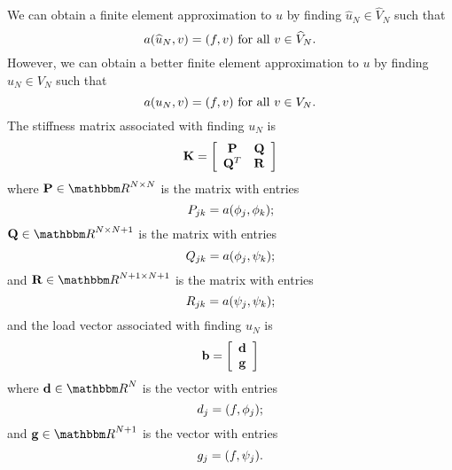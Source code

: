 We can obtain a finite element approximation to $u$ by finding $\widehat{u}_N\in\widehat{V}_N$ such that
\[
a(\widehat{u}_N,v)=(f,v)\mbox{ for all }v\in\widehat{V}_N.
\]
However, we can obtain a better finite element approximation to $u$ by finding $u_N\in V_N$ such that
\[
a(u_N,v)=(f,v)\mbox{ for all }v\in V_N.
\]
The stiffness matrix associated with finding $u_N$ is
\[
{\bf K}=\left[\begin{array}{cc}{\bf P} & {\bf Q} \\ {\bf Q}^T & {\bf R}\end{array}\right]
\]
where $\BP\in\R^{N\times N}$ is the matrix with entries
\[
P_{jk}=a(\phi_j,\phi_k);
\]
$\BQ\in\R^{N\times N+1}$ is the matrix with entries
\[
Q_{jk}=a(\phi_j,\psi_k);
\]
and $\BR\in\R^{N+1\times N+1}$ is the matrix with entries
\[
R_{jk}=a(\psi_j,\psi_k);
\]
and the load vector associated with finding $u_N$ is
\[
{\bf b}=\left[\begin{array}{c}{\bf d} \\ {\bf g}\end{array}\right]
\]
where $\Bd\in\R^N$ is the vector with entries
\[
d_j=(f,\phi_j);
\]
and $\Bg\in\R^{N+1}$ is the vector with entries
\[
g_j=(f,\psi_j).
\]
\\
